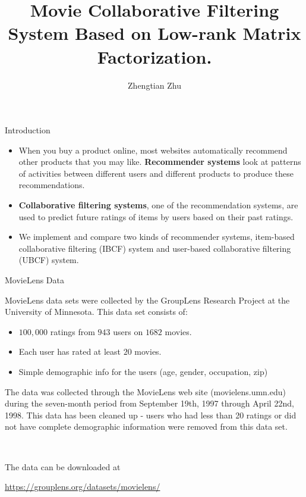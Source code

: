\documentclass[10 pt]{beamer}
\title[]{Movie Collaborative Filtering System Based on Low-rank Matrix Factorization.}
\author[Zhengtian Zhu]{Zhengtian Zhu \\[2mm]}
\institute[ISBD]{Institute of Statistics \& Big Data \\ Renmin University of China
	
}
\date{}
\newcommand{\bi}{\begin{itemize}}
\newcommand{\ei}{\end{itemize}}
\begin{document}
\begin{frame}
	\titlepage
\end{frame}

\begin{frame}{Introduction}
\bi
	\item When you buy a product online, most websites automatically recommend other products that you may like. \textbf{Recommender systems} look at patterns of activities between different users and different products to produce these recommendations.
	\item \textbf{Collaborative filtering systems}, one of the recommendation systems, are used to predict future ratings of items by users based on their past ratings. 
	\item We implement and compare two kinds of recommender systems, item-based collaborative filtering (IBCF) system and user-based collaborative filtering (UBCF) system.
\ei 
\end{frame}

\begin{frame}{MovieLens Data}

MovieLens data sets were collected by the GroupLens Research Project at the University of Minnesota. This data set consists of:
\bi
	\item $100,000$ ratings from $943$ users on $1682$ movies.
	\item Each user has rated at least $20$ movies.
	\item Simple demographic info for the users (age, gender, occupation, zip)
\ei

The data was collected through the MovieLens web site (movielens.umn.edu) during the seven-month period from September 19th, 1997 through April 22nd, 1998. This data has been cleaned up - users who had less than 20 ratings or did not have complete demographic information were removed from this data set.

\ 

The data can be downloaded at 

\url{https://grouplens.org/datasets/movielens/}
\end{frame}
\end{document}
